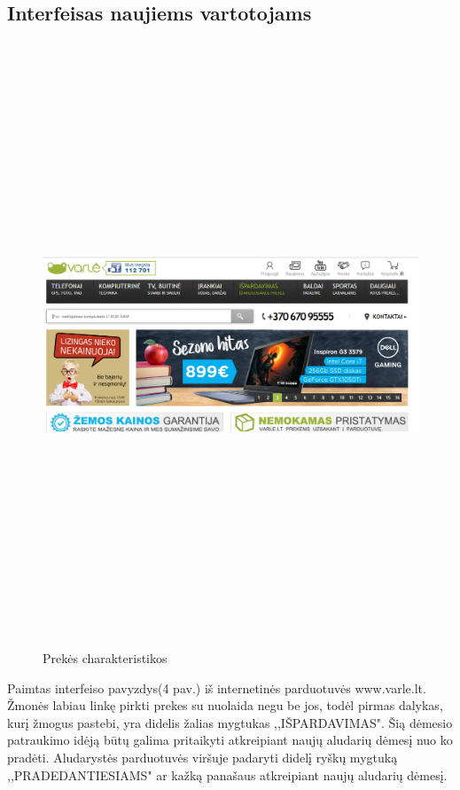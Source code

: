 \documentclass[oneside]{VUMIFPSkursinis}
\begin{document}
	\subsection{Interfeisas naujiems vartotojams}
		\begin{figure}[h]
			\centering
			\includegraphics[width=15cm,height=18cm,keepaspectratio]{IkvepiantisInterfeisas4.png}
			\caption{ Prekės charakteristikos}
		\end{figure}

		Paimtas interfeiso pavyzdys(4 pav.) iš internetinės parduotuvės www.varle.lt.
		Žmonės labiau linkę pirkti prekes su nuolaida negu be jos, todėl pirmas dalykas, kurį žmogus pastebi, yra didelis žalias mygtukas ,,IŠPARDAVIMAS".
		Šią dėmesio patraukimo idėją būtų galima pritaikyti atkreipiant naujų aludarių dėmesį nuo ko pradėti.
		Aludarystės parduotuvės viršuje padaryti didelį ryškų mygtuką ,,PRADEDANTIESIAMS" ar kažką panašaus atkreipiant naujų aludarių dėmesį.
		\pagebreak
\end{document}
